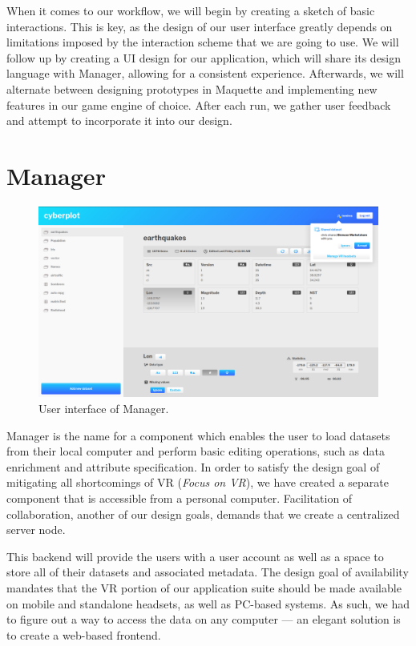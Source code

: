 \documentclass[thesis=M,english,hidelinks]{FITthesisXE}[2012/06/26]
\begin{document}
When it comes to our workflow, we will begin by creating a sketch of basic interactions. This is key, as the design of our user interface greatly depends on limitations imposed by the interaction scheme that we are going to use. We will follow up by creating a UI design for our application, which will share its design language with Manager, allowing for a consistent experience. Afterwards, we will alternate between designing prototypes in Maquette and implementing new features in our game engine of choice. After each run, we gather user feedback and attempt to incorporate it into our design.

\chapter{Manager}

\begin{figure}[ht]
\centering
\includegraphics[scale=0.2]{manager}
\caption{User interface of Manager.}
\label{fig:manager}
\end{figure}

Manager is the name for a component which enables the user to load datasets from their local computer and perform basic editing operations, such as data enrichment and attribute specification. In order to satisfy the design goal of mitigating all shortcomings of VR (\emph{Focus on VR}), we have created a separate component that is accessible from a personal computer. Facilitation of collaboration, another of our design goals, demands that we create a centralized server node. 

This backend will provide the users with a user account as well as a space to store all of their datasets and associated metadata. The design goal of availability mandates that the VR portion of our application suite should be made available on mobile and standalone headsets, as well as PC-based systems. As such, we had to figure out a way to access the data on any computer --- an elegant solution is to create a web-based frontend.
\end{document}

